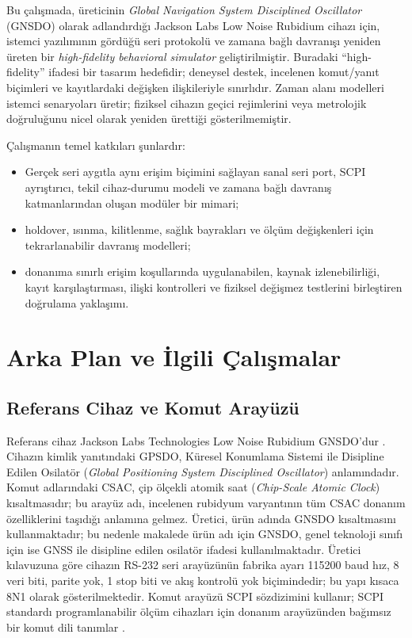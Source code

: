 \documentclass[9pt,twocolumn,a4paper]{extarticle}
\begin{document}
Bu çalışmada, üreticinin \emph{Global Navigation System Disciplined Oscillator} (GNSDO) olarak adlandırdığı Jackson Labs Low Noise Rubidium cihazı için, istemci yazılımının gördüğü seri protokolü ve zamana bağlı davranışı yeniden üreten bir \emph{high-fidelity behavioral simulator} geliştirilmiştir. Buradaki ``high-fidelity'' ifadesi bir tasarım hedefidir; deneysel destek, incelenen komut/yanıt biçimleri ve kayıtlardaki değişken ilişkileriyle sınırlıdır. Zaman alanı modelleri istemci senaryoları üretir; fiziksel cihazın geçici rejimlerini veya metrolojik doğruluğunu nicel olarak yeniden ürettiği gösterilmemiştir.

Çalışmanın temel katkıları şunlardır:
\begin{itemize}
    \item Gerçek seri aygıtla aynı erişim biçimini sağlayan sanal seri port, SCPI ayrıştırıcı, tekil cihaz-durumu modeli ve zamana bağlı davranış katmanlarından oluşan modüler bir mimari;
    \item holdover, ısınma, kilitlenme, sağlık bayrakları ve ölçüm değişkenleri için tekrarlanabilir davranış modelleri;
    \item donanıma sınırlı erişim koşullarında uygulanabilen, kaynak izlenebilirliği, kayıt karşılaştırması, ilişki kontrolleri ve fiziksel değişmez testlerini birleştiren doğrulama yaklaşımı.
\end{itemize}

\section{Arka Plan ve İlgili Çalışmalar}
\subsection{Referans Cihaz ve Komut Arayüzü}
Referans cihaz Jackson Labs Technologies Low Noise Rubidium GNSDO'dur \cite{jlt2015}. Cihazın kimlik yanıtındaki GPSDO, Küresel Konumlama Sistemi ile Disipline Edilen Osilatör (\emph{Global Positioning System Disciplined Oscillator}) anlamındadır. Komut adlarındaki CSAC, çip ölçekli atomik saat (\emph{Chip-Scale Atomic Clock}) kısaltmasıdır; bu arayüz adı, incelenen rubidyum varyantının tüm CSAC donanım özelliklerini taşıdığı anlamına gelmez. Üretici, ürün adında GNSDO kısaltmasını kullanmaktadır; bu nedenle makalede ürün adı için GNSDO, genel teknoloji sınıfı için ise GNSS ile disipline edilen osilatör ifadesi kullanılmaktadır. Üretici kılavuzuna göre cihazın RS-232 seri arayüzünün fabrika ayarı 115200 baud hız, 8 veri biti, parite yok, 1 stop biti ve akış kontrolü yok biçimindedir; bu yapı kısaca 8N1 olarak gösterilmektedir. Komut arayüzü SCPI sözdizimini kullanır; SCPI standardı programlanabilir ölçüm cihazları için donanım arayüzünden bağımsız bir komut dili tanımlar \cite{scpi1999}.
\end{document}
